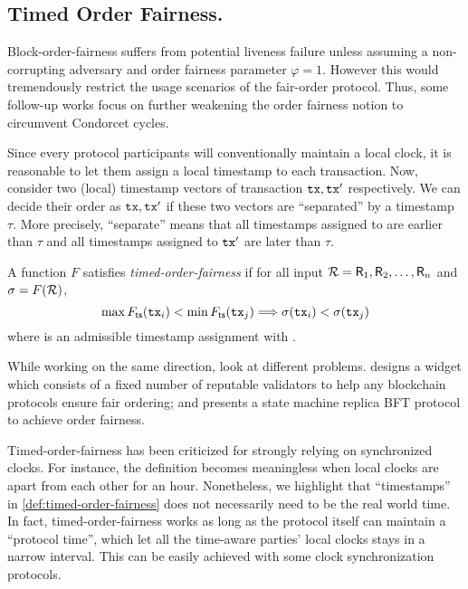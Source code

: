 \subsection{Timed Order Fairness.}

Block-order-fairness suffers from potential liveness failure unless assuming a non-corrupting adversary and order fairness parameter $\varphi = 1$.
%
However this would tremendously restrict the usage scenarios of the fair-order protocol.
%
Thus, some follow-up works \cite{AFT:Kursawe20,OSDI:ZSCZA20} focus on further weakening the order fairness notion to circumvent Condorcet cycles.

Since every protocol participants will conventionally maintain a local clock, it is reasonable to let them assign a local timestamp to each transaction.
%
Now, consider two (local) timestamp vectors of transaction $\mathtt{tx}, \mathtt{tx}'$ respectively.
%
We can decide their order as $\mathtt{tx}, \mathtt{tx}'$ if these two vectors are ``separated'' by a timestamp $\tau$.
%
More precisely, ``separate'' means that all timestamps assigned to \tx are earlier than $\tau$ and all timestamps assigned to $\mathtt{tx}'$ are later than $\tau$.

\begin{definition}
    \label{def:timed-order-fairness}

    A function $F$ satisfies \emph{timed-order-fairness} if for all input $\mathcal{R} = \mathsf{R}_1, \mathsf{R}_2, \ldots, \mathsf{R}_n$ and $\sigma = F(\mathcal{R})$,
    \[
        \max F_{\mathsf{ts}}(\mathtt{tx}_i) < \min F_{\mathsf{ts}}(\mathtt{tx}_j) \Longrightarrow \sigma(\mathtt{tx}_i) < \sigma(\mathtt{tx}_j)
    \]
    where \mapTimestamp is an admissible timestamp assignment with \profileSet.
\end{definition}

While working on the same direction, \cite{AFT:Kursawe20,OSDI:ZSCZA20} look at different problems. \cite{AFT:Kursawe20} designs a widget which consists of a fixed number of reputable validators to help any blockchain protocols ensure fair ordering; and \cite{OSDI:ZSCZA20} presents a state machine replica BFT protocol to achieve order fairness.

Timed-order-fairness has been criticized for strongly relying on synchronized clocks.
%
For instance, the definition becomes meaningless when local clocks are apart from each other for an hour.
%
Nonetheless, we highlight that ``timestamps'' in \cref{def:timed-order-fairness} does not necessarily need to be the real world time.
%
In fact, timed-order-fairness works as long as the protocol itself can maintain a ``protocol time'', which let all the time-aware parties' local clocks stays in a narrow interval.
%
This can be easily achieved with some clock synchronization protocols.
